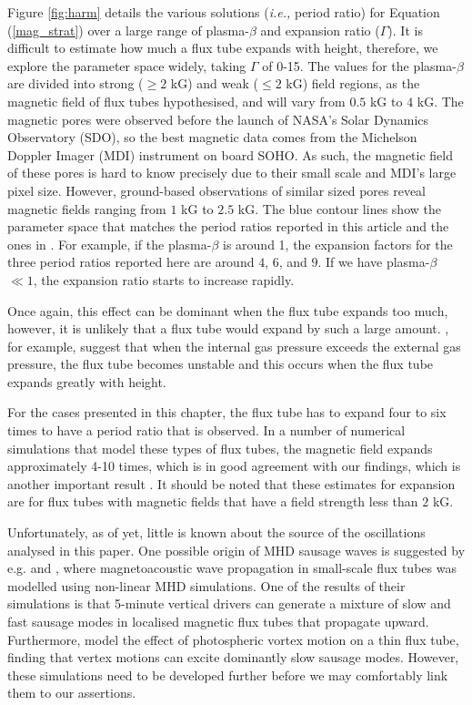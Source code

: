     Figure \ref{fig:harm} details the various solutions (\textit{i.e.,} period ratio) for Equation (\ref{mag_strat}) over a large range of plasma-$\beta$ and expansion ratio ($\Gamma$).
    It is difficult to estimate how much a flux tube expands with height, therefore, we explore the parameter space widely, taking $\Gamma$ of 0-15.
    The values for the plasma-$\beta$ are divided into strong ($\geq2$ kG) and weak ($\leq2$ kG) field regions, as the magnetic field of flux tubes hypothesised, and will vary from $0.5$ kG to $4$ kG.
    The magnetic pores were observed before the launch of NASA's Solar Dynamics Observatory (SDO),
    so the best magnetic data comes from the Michelson Doppler Imager (MDI) instrument on board SOHO.
    As such, the magnetic field of these pores is hard to know precisely due to their small scale and MDI's large pixel size.
    However, ground-based observations of similar sized pores reveal magnetic fields ranging from $1$ kG to $2.5$ kG.
    The blue contour lines show the parameter space that matches the period ratios reported in this article and the ones in \citet{Dorotovic2014}.
    For example, if the plasma-$\beta$ is around 1, the expansion factors for the three period ratios reported here are around $4$, $6$, and $9$.
    If we have plasma-$\beta$ $\ll 1$, the expansion ratio starts to increase rapidly. 
    
    Once again, this effect can be dominant when the flux tube expands too much, however, it is unlikely that a flux tube would expand by such a large amount.
    \citet{1982GApFD21237B}, for example, suggest that when the internal gas pressure exceeds the external gas pressure, the flux tube becomes unstable and this occurs when the flux tube expands greatly with height.
    
    For the cases presented in this chapter, the flux tube has to expand four to six times to have a period ratio that is observed.
    In a number of numerical simulations that model these types of flux tubes, the magnetic field expands approximately 4-10 times, which is in good agreement with our findings, which is another important result \citep[see][]{khomenko,fedun2,fedun1}.
    It should be noted that these estimates for expansion are for flux tubes with magnetic fields that have a field strength less than $2$ kG. 
    
    Unfortunately, as of yet, little is known about the source of the oscillations analysed in this paper.
    One possible origin of MHD sausage waves is suggested by e.g. \citet{khomenko} and \citet{fedun2}, where magnetoacoustic wave propagation in small-scale flux tubes was modelled using non-linear MHD simulations.
    One of the results of their simulations is that 5-minute vertical drivers can generate a mixture of slow and fast sausage modes in localised magnetic flux tubes that propagate upward.
    Furthermore, \citet{fedun1} model the effect of photospheric vortex motion on a thin flux tube, finding that vertex motions can excite dominantly slow sausage modes.
    However, these simulations need to be developed further before we may comfortably link them to our assertions.

